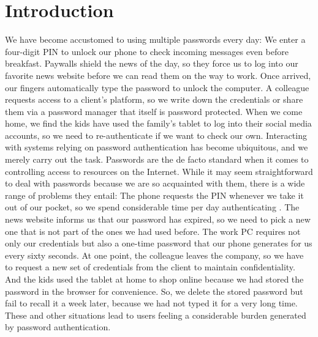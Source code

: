 \chapter[Introduction]{Introduction}\label{chap:intro}

We have become accustomed to using multiple passwords every day: We enter a four-digit PIN to unlock our phone to check incoming messages even before breakfast. Paywalls shield the news of the day, so they force us to log into our favorite news website before we can read them on the way to work. Once arrived, our fingers automatically type the password to unlock the computer. A colleague requests access to a client's platform, so we write down the credentials or share them via a password manager that itself is password protected. When we come home, we find the kids have used the family's tablet to log into their social media accounts, so we need to re-authenticate if we want to check our own. Interacting with systems relying on password authentication has become ubiquitous, and we merely carry out the task. Passwords are the de facto standard when it comes to controlling access to resources on the Internet. While it may seem straightforward to deal with passwords because we are so acquainted with them, there is a wide range of problems they entail:
The phone requests the PIN whenever we take it out of our pocket, so we spend considerable time per day authenticating \cite{Harbach2016HardLockLife}. The news website informs us that our password has expired, so we need to pick a new one that is not part of the ones we had used before. The work PC requires not only our credentials but also a one-time password that our phone generates for us every sixty seconds. At one point, the colleague leaves the company, so we have to request a new set of credentials from the client to maintain confidentiality. And the kids used the tablet at home to shop online because we had stored the password in the browser for convenience. So, we delete the stored password but fail to recall it a week later, because we had not typed it for a very long time. These and other situations lead to users feeling a considerable burden generated by password authentication. 

